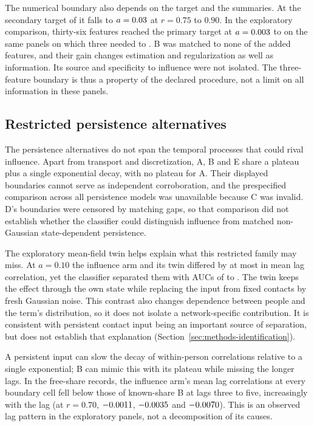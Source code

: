 The numerical boundary also depends on the target and the summaries. At the secondary target of  it falls to $a=\resultnum{v4.tab.T1sec.B.r075.a060.1}{0.03}$ at $r=0.75$ to $0.90$. In the exploratory comparison, thirty-six features reached the primary target at $a=\resultnum{j.x7.first.min}{0.003}$ to  on the same panels on which three needed  to . B was matched to none of the added features, and their gain changes estimation and regularization as well as information. Its source and specificity to influence were not isolated. The three-feature boundary is thus a property of the declared procedure, not a limit on all information in these panels.

\subsection{Restricted persistence alternatives}\label{sec:disc-mechanism}

The persistence alternatives do not span the temporal processes that could rival influence. Apart from transport and discretization, A, B and E share a plateau plus a single exponential decay, with no plateau for A. Their displayed boundaries cannot serve as independent corroboration, and the prespecified comparison across all persistence models was unavailable because C was invalid. D's boundaries were censored by matching gaps, so that comparison did not establish whether the classifier could distinguish influence from matched non-Gaussian state-dependent persistence.

The exploratory mean-field twin helps explain what this restricted family may miss. At $a=0.10$ the influence arm and its twin differed by at most  in mean lag correlation, yet the classifier separated them with AUCs of  to . The twin keeps the effect through the own state while replacing the input from fixed contacts by fresh Gaussian noise. This contrast also changes dependence between people and the term's distribution, so it does not isolate a network-specific contribution. It is consistent with persistent contact input being an important source of separation, but does not establish that explanation (Section~\ref{sec:methods-identification}).

A persistent input can slow the decay of within-person correlations relative to a single exponential; B can mimic this with its plateau while missing the longer lags. In the free-share records, the influence arm's mean lag correlations at every boundary cell fell below those of known-share B at lags three to five, increasingly with the lag (at $r=0.70$, $\resultnum{j.x3.lag_shortfall.r070.l3}{-0.0011}$, $\resultnum{j.x3.lag_shortfall.r070.l4}{-0.0035}$ and $\resultnum{j.x3.lag_shortfall.r070.l5}{-0.0070}$). This is an observed lag pattern in the exploratory panels, not a decomposition of its causes.

